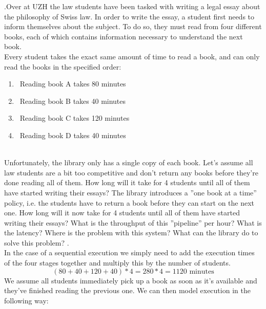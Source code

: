 \documentclass[main.tex]{subfiles}
\begin{document}
\begin{ExerciseList}
    \Exercise[title={Pipelining},label=pipe].\quad Over at UZH the law students have been tasked with writing a legal essay about the philosophy of Swiss law. In order to write the essay, a student first needs to inform themselves about the subject. To do so, they must read from four different books, each of which contains information necessary to understand the next book. \\[3mm]
    Every student takes the exact same amount of time to read a book, and can only read the books in the specified order:
    \begin{enumerate}[label=\arabic*)]
        \item\ Reading book A takes 80 minutes
        \item\ Reading book B takes 40 minutes
        \item\ Reading book C takes 120 minutes
        \item\ Reading book D takes 40 minutes
    \end{enumerate}\\
    Unfortunately, the library only has a single copy of each book.
        \Question Let's assume all law students are a bit too competitive and don't return any books before they're done reading all of them. How long will it take for 4 students until all of them have started writing their essays?
        \Question The library introduces a ''one book at a time'' policy, i.e. the students have to return a book before they can start on the next one. How long will it now take for 4 students until all of them have started writing their essays? What is the throughput of this ''pipeline'' per hour? What is the latency?
        \Question Where is the problem with this system? What can the library do to solve this problem?
    \Answer[ref={pipe}].\\
        \Question In the case of a sequential execution we simply need to add the execution times of the four stages together and multiply this by the number of students.
            \begin{equation*}
                (80 + 40 + 120 + 40) * 4 = 280 * 4  = 1120 \text{ minutes}
            \end{equation*}
        \Question We assume all students immediately pick up a book as soon as it's available and they've finished reading the previous one. We can then model execution in the following way: \\[3mm]
            \begin{small}
                \begin{tabular}{l | *{19}{c}}

\end{tabular}
\end{small}
\end{ExerciseList}
\end{document}
